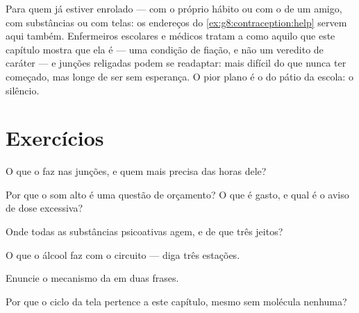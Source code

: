 \begin{example}\label{ex:g8:protecting-the-nervous-system:help}
Para quem já estiver enrolado --- com o próprio hábito ou com o de um
amigo, com substâncias ou com telas: os endereços do
\cref{ex:g8:contraception:help} servem aqui também. Enfermeiros
escolares e médicos tratam a  como aquilo que este capítulo
mostra que ela é --- uma condição de fiação, e não um veredito de
caráter --- e junções religadas podem se readaptar: mais difícil do
que nunca ter começado, mas longe de ser sem esperança. O pior plano é
o do pátio da escola: o silêncio.
\end{example}

\section{Exercícios}

\begin{exercise}[$\star$]\label{exo:g8:protecting-the-nervous-system:1}
O que o  faz nas junções, e quem mais precisa das horas dele?
\end{exercise}

\begin{exercise}[$\star$]\label{exo:g8:protecting-the-nervous-system:2}
Por que o som alto é uma questão de orçamento? O que é gasto, e qual é
o aviso de dose excessiva?
\end{exercise}

\begin{exercise}[$\star$]\label{exo:g8:protecting-the-nervous-system:3}
Onde todas as substâncias psicoativas agem, e de que três jeitos?
\end{exercise}

\begin{exercise}[$\star$]\label{exo:g8:protecting-the-nervous-system:4}
O que o álcool faz com o circuito --- diga três estações.
\end{exercise}

\begin{exercise}[$\star$]\label{exo:g8:protecting-the-nervous-system:5}
Enuncie o mecanismo da  em duas frases.
\end{exercise}

\begin{exercise}[$\star$]\label{exo:g8:protecting-the-nervous-system:6}
Por que o ciclo da tela pertence a este capítulo, mesmo sem molécula
nenhuma?
\end{exercise}

